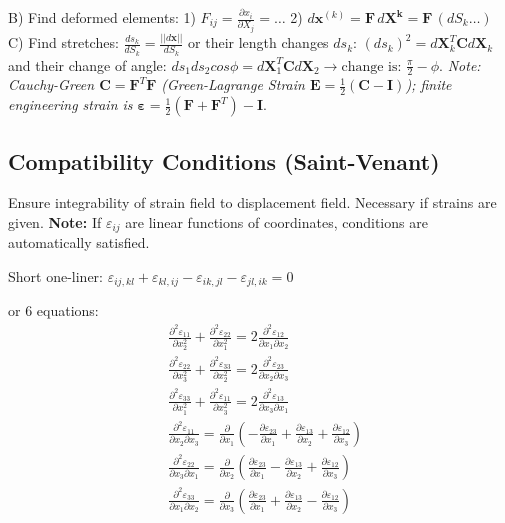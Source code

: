 \documentclass[10pt,twocolumn, a4paper]{article}
\begin{document}
\begin{itemize}
    B) Find deformed elements: 
    1) $F_{ij} = \frac{\partial x_i}{\partial X_j} = \dots$ 
    2) $d \bm{x}^{(k)} = \bm{F}\,d\bm{X^{k}} = \bm{F}\,(dS_k\dots)$ \\
    C) Find stretches: $\frac{ds_k}{dS_k} = \frac{||d\bm{x}||}{dS_k}$ or their length changes $ds_k$: $(ds_k)^2 = d\bm{X}_k^T \bm{C} d\bm{X}_k$ and their change of angle: $ds_1 ds_2cos\phi = d\bm{X}^T_1 \bm{C} d\bm{X}_2 \rightarrow \text{change is: } \frac{\pi}{2}-\phi$.
    \textit{Note: Cauchy-Green $\bm{C} = \bm{F}^T\bm{F}$ (Green-Lagrange Strain $\bm{E} = \frac{1}{2}(\bm{C}-\bm{I})$); finite engineering strain is $\bm{\varepsilon} = \frac{1}{2}(\bm{F}+\bm{F}^T) - \bm{I}$}.
\end{itemize}

\subsection{Compatibility Conditions (Saint-Venant)}
Ensure integrability of strain field to displacement field. Necessary if strains are given.
\textbf{Note:} If $\varepsilon_{ij}$ are linear functions of coordinates, conditions are automatically satisfied. 

Short one-liner: $\varepsilon_{ij,kl} + \varepsilon_{kl,ij} - \varepsilon_{ik,jl} - \varepsilon_{jl,ik} = 0$

or 6 equations:
\begin{align*}    
    &\frac{\partial^2 \varepsilon_{11}}{\partial x_2^2} + \frac{\partial^2 \varepsilon_{22}}{\partial x_1^2} = 2 \frac{\partial^2 \varepsilon_{12}}{\partial x_1 \partial x_2} \\
    &\frac{\partial^2 \varepsilon_{22}}{\partial x_3^2} + \frac{\partial^2 \varepsilon_{33}}{\partial x_2^2} = 2 \frac{\partial^2 \varepsilon_{23}}{\partial x_2 \partial x_3} \\
    &\frac{\partial^2 \varepsilon_{33}}{\partial x_1^2} + \frac{\partial^2 \varepsilon_{11}}{\partial x_3^2} = 2 \frac{\partial^2 \varepsilon_{13}}{\partial x_3 \partial x_1} \\
    &\frac{\partial^2 \varepsilon_{11}}{\partial x_2 \partial x_3} = \frac{\partial}{\partial x_1} \left( -\frac{\partial \varepsilon_{23}}{\partial x_1} + \frac{\partial \varepsilon_{13}}{\partial x_2} + \frac{\partial \varepsilon_{12}}{\partial x_3} \right) \\
    &\frac{\partial^2 \varepsilon_{22}}{\partial x_3 \partial x_1} = \frac{\partial}{\partial x_2} \left( \frac{\partial \varepsilon_{23}}{\partial x_1} - \frac{\partial \varepsilon_{13}}{\partial x_2} + \frac{\partial \varepsilon_{12}}{\partial x_3} \right) \\
    &\frac{\partial^2 \varepsilon_{33}}{\partial x_1 \partial x_2} = \frac{\partial}{\partial x_3} \left( \frac{\partial \varepsilon_{23}}{\partial x_1} + \frac{\partial \varepsilon_{13}}{\partial x_2} - \frac{\partial \varepsilon_{12}}{\partial x_3} \right)
\end{align*}
\end{document}
